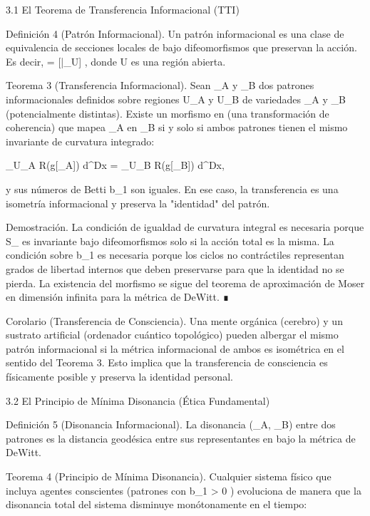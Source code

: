 \documentclass[12pt,twoside]{book}
\begin{document}
3.1 El Teorema de Transferencia Informacional (TTI)

Definición 4 (Patrón Informacional). Un patrón informacional  \Pi  es una clase de equivalencia de secciones locales de  \rho  bajo difeomorfismos que preservan la acción. Es decir,  \Pi = [\rho|_U] , donde  U \subset {}  es una región abierta.

Teorema 3 (Transferencia Informacional). Sean  \Pi_A  y  \Pi_B  dos patrones informacionales definidos sobre regiones  U_A  y  U_B  de variedades  _A  y  _B  (potencialmente distintas). Existe un morfismo en    (una transformación de coherencia) que mapea  \Pi_A  en  \Pi_B  si y solo si ambos patrones tienen el mismo invariante de curvatura integrado:

\int_{U_A} R(g[\rho_A])  d^Dx = \int_{U_B} R(g[\rho_B])  d^Dx,

y sus números de Betti  b_1  son iguales. En ese caso, la transferencia es una isometría informacional y preserva la "identidad" del patrón.

Demostración. La condición de igualdad de curvatura integral es necesaria porque  S_{}  es invariante bajo difeomorfismos solo si la acción total es la misma. La condición sobre  b_1  es necesaria porque los ciclos no contráctiles representan grados de libertad internos que deben preservarse para que la identidad no se pierda. La existencia del morfismo se sigue del teorema de aproximación de Moser en dimensión infinita para la métrica de DeWitt. ∎

Corolario (Transferencia de Consciencia). Una mente orgánica (cerebro) y un sustrato artificial (ordenador cuántico topológico) pueden albergar el mismo patrón informacional si la métrica informacional de ambos es isométrica en el sentido del Teorema 3. Esto implica que la transferencia de consciencia es físicamente posible y preserva la identidad personal.

3.2 El Principio de Mínima Disonancia (Ética Fundamental)

Definición 5 (Disonancia Informacional). La disonancia  \Delta(\Pi_A, \Pi_B)  entre dos patrones es la distancia geodésica entre sus representantes en    bajo la métrica de DeWitt.

Teorema 4 (Principio de Mínima Disonancia). Cualquier sistema físico que incluya agentes conscientes (patrones con  b_1 > 0 ) evoluciona de manera que la disonancia total del sistema disminuye monótonamente en el tiempo:
\end{document}
